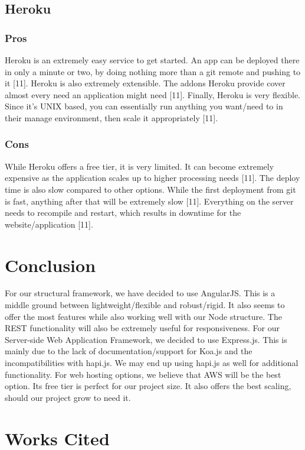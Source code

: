 \documentclass[onecolumn, draftclsnofoot,10pt, compsoc]{IEEEtran}
\begin{document}
	\subsection{Heroku}
	
		\subsubsection{Pros}
		Heroku is an extremely easy service to get started. An app can be deployed there in only a minute or two, by doing nothing more than a git remote and pushing to it [11]. Heroku is also extremely extensible. The addons Heroku provide cover almost every need an application might need [11]. Finally, Heroku is very flexible. Since it’s UNIX based, you can essentially run anything you want/need to in their manage environment, then scale it appropriately [11].
    \subsubsection{Cons}
    While Heroku offers a free tier, it is very limited. It can become extremely expensive as the application scales up to higher processing needs [11]. The deploy time is also slow compared to other options. While the first deployment from git is fast, anything after that will be extremely slow [11]. Everything on the server needs to recompile and restart, which results in downtime for the website/application [11].

\section{Conclusion}

For our structural framework, we have decided to use AngularJS. This is a middle ground between lightweight/flexible and robust/rigid. It also seems to offer the most features while also working well with our Node structure. The REST functionality will also be extremely useful for responsiveness. For our Server-side Web Application Framework, we decided to use Express.js. This is mainly due to the lack of documentation/support for Koa.js and the incompatibilities with hapi.js. We may end up using hapi.js as well for additional functionality. For web hosting options, we believe that AWS will be the best option. Its free tier is perfect for our project size. It also offers the best scaling, should our project grow to need it.

\pagebreak
	
\section{Works Cited}
\end{document}
